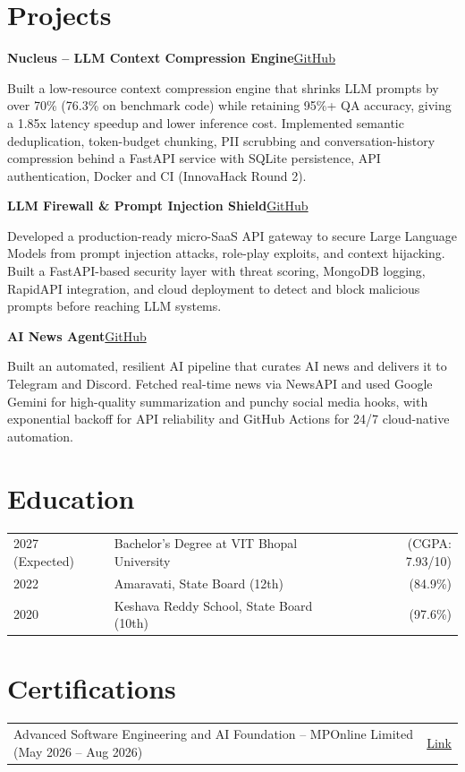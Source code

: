 \documentclass[10pt,letterpaper]{article}
\newcommand{\projecthead}[2]{%
  \noindent\textbf{#1}\hfill#2\par\vspace{1pt}}
\begin{document}
\section{Projects}
\projecthead{Nucleus -- LLM Context Compression Engine}{\small\href{https://github.com/Sankarsh369}{GitHub}}
Built a low-resource context compression engine that shrinks LLM prompts by over 70\% (76.3\% on benchmark
code) while retaining 95\%+ QA accuracy, giving a 1.85x latency speedup and lower inference cost. Implemented
semantic deduplication, token-budget chunking, PII scrubbing and conversation-history compression behind a
FastAPI service with SQLite persistence, API authentication, Docker and CI (InnovaHack Round 2).

\vspace{5pt}
\projecthead{LLM Firewall \& Prompt Injection Shield}{\small\href{https://github.com/Sankarsh369}{GitHub}}
Developed a production-ready micro-SaaS API gateway to secure Large Language Models from prompt injection
attacks, role-play exploits, and context hijacking. Built a FastAPI-based security layer with threat scoring,
MongoDB logging, RapidAPI integration, and cloud deployment to detect and block malicious prompts before
reaching LLM systems.

\vspace{5pt}
\projecthead{AI News Agent}{\small\href{https://github.com/Sankarsh369}{GitHub}}
Built an automated, resilient AI pipeline that curates AI news and delivers it to Telegram and Discord. Fetched
real-time news via NewsAPI and used Google Gemini for high-quality summarization and punchy social media
hooks, with exponential backoff for API reliability and GitHub Actions for 24/7 cloud-native automation.

\section{Education}
\begin{tabularx}{\linewidth}{@{}l X r@{}}
  2027 (Expected) & Bachelor's Degree at VIT Bhopal University & (CGPA: 7.93/10) \\
  2022 & Amaravati, State Board (12th) & (84.9\%) \\
  2020 & Keshava Reddy School, State Board (10th) & (97.6\%) \\
\end{tabularx}

\section{Certifications}
\begin{tabularx}{\linewidth}{@{}X r@{}}
  Advanced Software Engineering and AI Foundation -- MPOnline Limited (May 2026 -- Aug 2026) &
  \href{https://github.com/Sankarsh369}{Link} \\
\end{tabularx}
\end{document}
